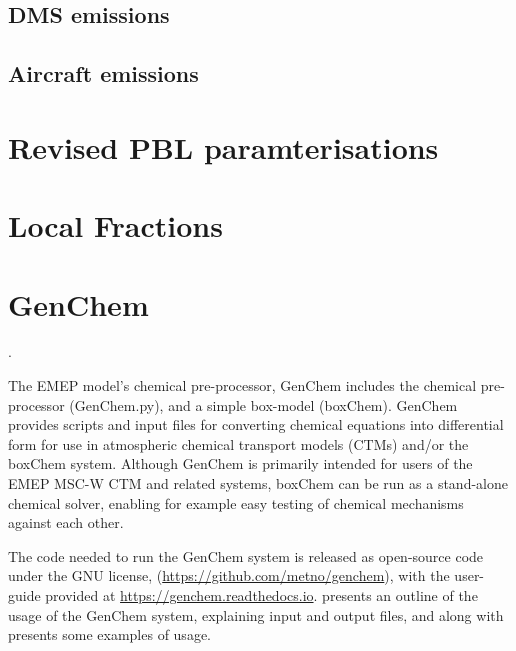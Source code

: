 
\subsection{DMS emissions}
\label{ssec:DMS}


\subsection{Aircraft emissions}
\label{ssec:Aircraft}


\section{Revised PBL paramterisations}
\label{ssec:PBL}


\section{Local Fractions}
\label{sec:LFrac}



\section{GenChem}
\label{sec:GChem}.

The EMEP model's chemical pre-processor, GenChem \citep{Simpson:GenChem}
includes the chemical pre-processor (GenChem.py), and a simple box-model
(boxChem). GenChem provides scripts and input files for converting
chemical equations into differential form for use in atmospheric chemical
transport models (CTMs) and/or the boxChem system.  Although GenChem is
primarily intended for users of the EMEP MSC-W CTM and related systems,
boxChem can be run as a stand-alone chemical solver, enabling for example
easy testing of chemical mechanisms against each other.


The code needed to run the GenChem  system is released as open-source
code under the GNU license, (\url{https://github.com/metno/genchem}),
with the user-guide provided at \url{https://genchem.readthedocs.io}.
\citet{Simpson:GenChem} presents an outline of the usage of the
GenChem system, explaining input and output files, and along with
\citet{BergstromEmChem2020} presents some examples of usage.



